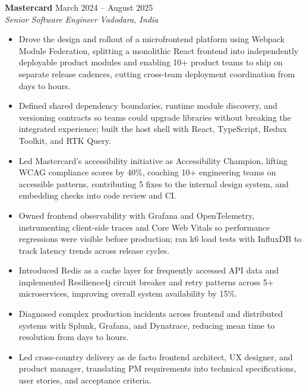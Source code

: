 \documentclass[a4paper,10pt]{article}
\newcommand{\role}[4]{
  \textbf{\color{accent}#1} \hfill {\small #2}\\
  \textit{#3} \hfill {\small \textit{#4}}
}
\begin{document}
\role{Mastercard}{March 2024 -- August 2025}{Senior Software Engineer}{Vadodara, India}
\begin{itemize}
  \item Drove the design and rollout of a microfrontend platform using Webpack Module Federation, splitting a monolithic React frontend into independently deployable product modules and enabling 10+ product teams to ship on separate release cadences, cutting cross-team deployment coordination from days to hours.
  \item Defined shared dependency boundaries, runtime module discovery, and versioning contracts so teams could upgrade libraries without breaking the integrated experience; built the host shell with React, TypeScript, Redux Toolkit, and RTK Query.
  \item Led Mastercard's accessibility initiative as Accessibility Champion, lifting WCAG compliance scores by 40\%, coaching 10+ engineering teams on accessible patterns, contributing 5 fixes to the internal design system, and embedding checks into code review and CI.
  \item Owned frontend observability with Grafana and OpenTelemetry, instrumenting client-side traces and Core Web Vitals so performance regressions were visible before production; ran k6 load tests with InfluxDB to track latency trends across release cycles.
  \item Introduced Redis as a cache layer for frequently accessed API data and implemented Resilience4j circuit breaker and retry patterns across 5+ microservices, improving overall system availability by 15\%.
  \item Diagnosed complex production incidents across frontend and distributed systems with Splunk, Grafana, and Dynatrace, reducing mean time to resolution from days to hours.
  \item Led cross-country delivery as de facto frontend architect, UX designer, and product manager, translating PM requirements into technical specifications, user stories, and acceptance criteria.
\end{itemize}
\end{document}
